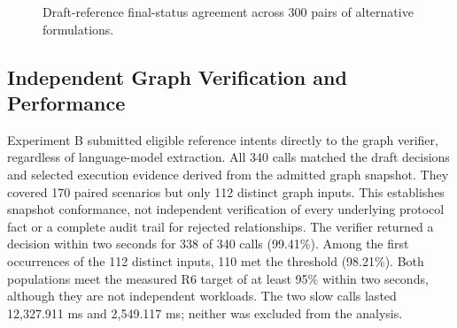 \begin{figure}[H]
\centering
{}
\caption{Draft-reference final-status agreement across 300 pairs of
alternative formulations.}
\label{fig:results_pairs}
\end{figure}

\subsection{Independent Graph Verification and Performance}
\label{sec:results_graph_latency}

Experiment B submitted eligible reference intents directly to the graph
verifier, regardless of language-model extraction. All 340 calls matched
the draft decisions and selected execution evidence derived from the
admitted graph snapshot. They covered 170 paired scenarios but only
112 distinct graph inputs. This establishes snapshot conformance, not
independent verification of every underlying protocol fact or a complete
audit trail for rejected relationships. The verifier returned a decision within two seconds for 338 of 340 calls
(99.41\%). Among the first occurrences of the 112 distinct inputs,
110 met the threshold (98.21\%). Both populations meet the measured
R6 target of at least 95\% within two seconds, although they are not
independent workloads. The two slow calls lasted 12,327.911 ms and
2,549.117 ms; neither was excluded from the analysis. 

